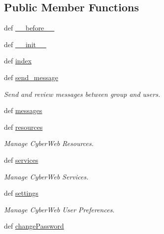 \subsection*{\-Public \-Member \-Functions}
\begin{DoxyCompactItemize}
\item 
def \hyperlink{classcyberweb_1_1controllers_1_1user_1_1_user_controller_a92244576e103b88ce86016266958224a}{\-\_\-\-\_\-before\-\_\-\-\_\-}
\item 
def \hyperlink{classcyberweb_1_1controllers_1_1user_1_1_user_controller_ae4984d9792551cb4a4856c211c81cc02}{\-\_\-\-\_\-init\-\_\-\-\_\-}
\item 
def \hyperlink{classcyberweb_1_1controllers_1_1user_1_1_user_controller_a0defaafda3f91a1fdd5678a3c31540e9}{index}
\item 
def \hyperlink{classcyberweb_1_1controllers_1_1user_1_1_user_controller_a5275d9003912519c013d4e4f6454f1e9}{send\-\_\-message}
\begin{DoxyCompactList}\small\item\em \-Send and review messages between group and users. \end{DoxyCompactList}\item 
def \hyperlink{classcyberweb_1_1controllers_1_1user_1_1_user_controller_a8f736afe8705785f19a20ab2187382c2}{messages}
\item 
def \hyperlink{classcyberweb_1_1controllers_1_1user_1_1_user_controller_aed979b7a2effa4c31c7f6e90822ef71c}{resources}
\begin{DoxyCompactList}\small\item\em \-Manage \-Cyber\-Web \-Resources. \end{DoxyCompactList}\item 
def \hyperlink{classcyberweb_1_1controllers_1_1user_1_1_user_controller_a2860b4358c6e2a5eda6f984d08234561}{services}
\begin{DoxyCompactList}\small\item\em \-Manage \-Cyber\-Web \-Services. \end{DoxyCompactList}\item 
def \hyperlink{classcyberweb_1_1controllers_1_1user_1_1_user_controller_a4df1f91ef8d6b433d02ae61c7f032ead}{settings}
\begin{DoxyCompactList}\small\item\em \-Manage \-Cyber\-Web \-User \-Preferences. \end{DoxyCompactList}\item 
def \hyperlink{classcyberweb_1_1controllers_1_1user_1_1_user_controller_aaaa2e4ff7dd68f02ba72a41835790df7}{change\-Password}

\end{DoxyCompactItemize}
